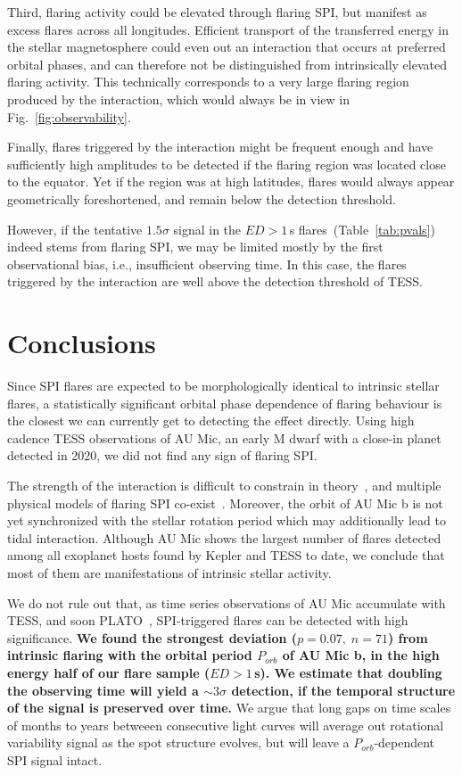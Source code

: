\documentclass[fleqn,usenatbib]{mnras}%
\begin{document}
Third, flaring activity could be elevated through flaring SPI, but manifest as excess flares across all longitudes. Efficient transport of the transferred energy in the stellar magnetosphere could even out an interaction that occurs at preferred orbital phases, and can therefore not be distinguished from intrinsically elevated flaring activity. This technically corresponds to a very large flaring region produced by the interaction, which would always be in view in Fig.~\ref{fig:observability}.

Finally, flares triggered by the interaction might be frequent enough and have sufficiently high amplitudes to be detected if the flaring region was located close to the equator. Yet if the region was at high latitudes, flares would always appear geometrically foreshortened, and remain below the detection threshold.

However, if the tentative $1.5\sigma$ signal in the $ED>1$\,s flares~(Table~\ref{tab:pvals}) indeed stems from flaring SPI, we may be limited mostly by the first observational bias, i.e., insufficient observing time. In this case, the flares triggered by the interaction are well above the detection threshold of TESS.

\section{Conclusions}
\label{sec:conclusions}
Since SPI flares are expected to be morphologically identical to intrinsic stellar flares, a statistically significant orbital phase dependence of flaring behaviour is the closest we can currently get to detecting the effect directly. Using high cadence TESS observations of AU Mic, an early M dwarf with a close-in planet detected in 2020, we did not find any sign of flaring SPI.

The strength of the interaction is difficult to constrain in theory~\citep{strugarek2019}, and multiple physical models of flaring SPI co-exist~\citep{lanza2018close-by, saur2013magnetic}. Moreover, the orbit of AU Mic b is not yet synchronized with the stellar rotation period which may additionally lead to tidal interaction. Although AU Mic shows the largest number of flares detected among all exoplanet hosts found by Kepler and TESS to date, we conclude that most of them are manifestations of intrinsic stellar activity. 

We do not rule out that, as time series observations of AU Mic accumulate with TESS, and soon PLATO~\citep{rauer2014plato}, SPI-triggered flares can be detected with high significance. \textbf{We found the strongest deviation ($p=0.07,\;n=71$) from intrinsic flaring with the orbital period $P_{orb}$ of AU Mic b, in the high energy half of our flare sample ($ED>1$\,s). We estimate that doubling the observing time will yield a $\sim 3\sigma$ detection, if the temporal structure of the signal is preserved over time.} We argue that long gaps on time scales of months to years betweeen consecutive light curves will average out rotational variability signal as the spot structure evolves, but will leave a $P_{orb}$-dependent SPI signal intact. 
\end{document}

